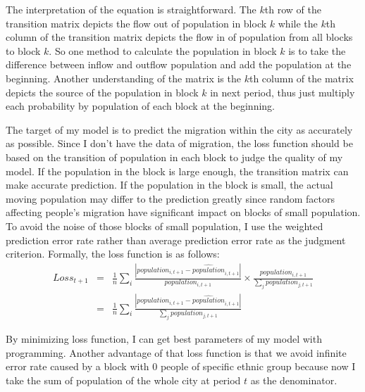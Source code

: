 \documentclass{article}
\begin{document}
\par The interpretation of the equation is straightforward. The $k$th row of the transition matrix depicts the flow out of population in block $k$ while the $k$th column of the transition matrix depicts the flow in of population from all blocks to block $k$. So one method to calculate the population in block $k$ is to take the difference between inflow and outflow population and add the population at the beginning. Another understanding of the matrix is the $k$th column of the matrix depicts the source of the population in block $k$ in next period, thus just multiply each probability by population of each block at the beginning.
\par The target of my model is to predict the migration within the city as accurately as possible. Since I don’t have the data of migration, the loss function should be based on the transition of population in each block to judge the quality of my model. If the population in the block is large enough, the transition matrix can make accurate prediction. If the population in the block is small, the actual moving population may differ to the prediction greatly since random factors affecting people’s migration have significant impact on blocks of small population. To avoid the noise of those blocks of small population, I use the weighted prediction error rate rather than average prediction error rate as the judgment criterion. Formally, the loss function is as follows:
\begin{eqnarray} 
Loss_{t+1} &=& \frac{1}{n} \sum_{i} \frac{|population_{i,t+1} - \widehat{population}_{i,t+1}|}{population_{i,t+1}} \times \frac{population_{i,t+1}}{\sum_j population_{j,t+1}} \nonumber \\
&=& \frac{1}{n} \sum_{i} \frac{|population_{i,t+1} - \widehat{population}_{i,t+1}|}{\sum_j population_{j,t+1}}
\end{eqnarray}
\par By minimizing loss function, I can get best parameters of my model with programming. Another advantage of that loss function is that we avoid infinite error rate caused by a block with 0 people of specific ethnic group because now I take the sum of population of the whole city at period $t$ as the denominator.
\end{document}
